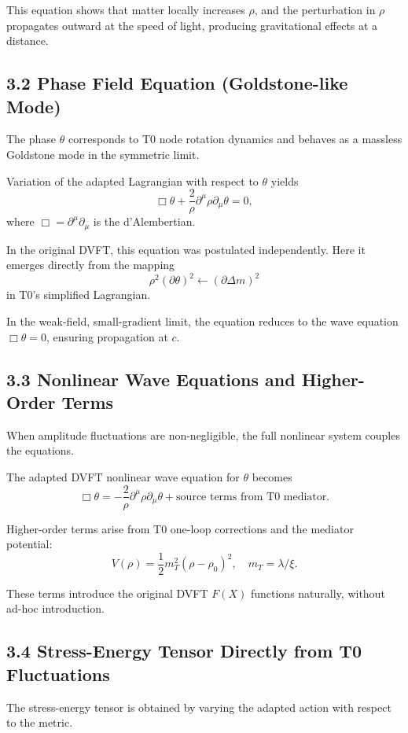	This equation shows that matter locally increases $\rho$, and the perturbation in $\rho$ propagates outward at the speed of light, producing gravitational effects at a distance.
	
	\subsection{3.2 Phase Field Equation (Goldstone-like Mode)}
	
	The phase $\theta$ corresponds to T0 node rotation dynamics and behaves as a massless Goldstone mode in the symmetric limit.
	
	Variation of the adapted Lagrangian with respect to $\theta$ yields
	\[
	\Box \theta + \frac{2}{\rho} \partial^\mu \rho \partial_\mu \theta = 0,
	\]
	where $\Box = \partial^\mu \partial_\mu$ is the d'Alembertian.
	
	In the original DVFT, this equation was postulated independently. Here it emerges directly from the mapping
	\[
	\rho^2 (\partial \theta)^2 \leftarrow (\partial \Delta m)^2
	\]
	in T0's simplified Lagrangian.
	
	In the weak-field, small-gradient limit, the equation reduces to the wave equation $\Box \theta = 0$, ensuring propagation at $c$.
	
	\subsection{3.3 Nonlinear Wave Equations and Higher-Order Terms}
	
	When amplitude fluctuations are non-negligible, the full nonlinear system couples the equations.
	
	The adapted DVFT nonlinear wave equation for $\theta$ becomes
	\[
	\Box \theta = -\frac{2}{\rho} \partial^\mu \rho \partial_\mu \theta + \text{source terms from T0 mediator}.
	\]
	
	Higher-order terms arise from T0 one-loop corrections and the mediator potential:
	\[
	V(\rho) = \frac{1}{2} m_T^2 (\rho - \rho_0)^2, \quad m_T = \lambda / \xi.
	\]
	
	These terms introduce the original DVFT $F(X)$ functions naturally, without ad-hoc introduction.
	
	\subsection{3.4 Stress-Energy Tensor Directly from T0 Fluctuations}
	
	The stress-energy tensor is obtained by varying the adapted action with respect to the metric.
	
